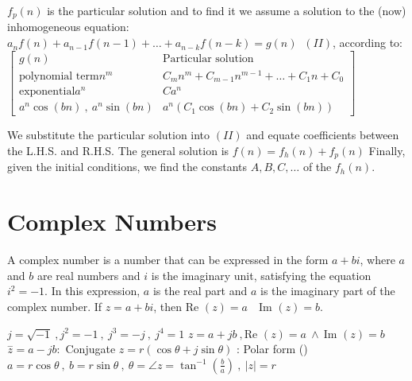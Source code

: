 \documentclass[12pt]{article}
\def\Re{\text{Re\ }} %
\def\Im{\text{Im\ }} %
\begin{document}
\begin{flushleft}
	\textbullet \quad $f_p(n)$ is the particular solution and to find it we assume a solution to the (now) inhomogeneous equation: $\displaystyle a_n f(n) + a_{n-1} f(n-1) + \ldots + a_{n-k} f(n-k) = g(n) \ $ {\tiny $(II)$}, according to: \linebreak 
	$\displaystyle \begin{bmatrix}
	g(n) & \text{Particular solution} \\ 
	\text{polynomial term} n^m & C_m n^m + C_{m-1} n^{m-1} + \ldots + C_1 n + C_0 \\ 
	\text{exponential} a^n & Ca^n \\ 
	a^n \cos (bn) \ , \ a^n \sin (bn) & a^n \left( C_1 \cos (bn) + C_2 \sin (bn) \right) 
	\end{bmatrix} $
	
	We substitute the particular solution into $(II)$ and equate coefficients between the L.H.S. and R.H.S. \linebreak 
	\textbullet \quad The general solution is $f(n) = f_h(n) + f_p(n)$ \linebreak 
	\textbullet \quad Finally, given the initial conditions, we find the constants $A, B, C, \ldots $ of the $f_h(n)$. \linebreak 
	

	\pagebreak
	
	
	\section{Complex Numbers}
	
	\textbullet \quad A complex number is a number that can be expressed in the form $a + bi$, where $a$ and $b$ are real numbers and $i$ is the imaginary unit, satisfying the equation $i^2 = -1$. In this expression, $a$ is the real part and $a$ is the imaginary part of the complex number. If $z=a+bi$, then $ \Re (z) = a \quad \Im (z) = b$. \linebreak 
	
	\textbullet \quad $\displaystyle j = \sqrt{-1}\ , j^2 = -1 \ , \ j^3 = -j \ , \ j^4 = 1$ \linebreak 
	\textbullet \quad $\displaystyle z=a+jb \ , \Re(z)=a \ \land \ \Im(z) = b$ \linebreak 
	\textbullet \quad $\displaystyle \overset{-}{z} = a -jb: $ Conjugate \linebreak 
	\textbullet \quad $\displaystyle z = r\left(\cos \theta + j \sin \theta \right) $  :  Polar form () \linebreak 
	$\displaystyle a = r \cos \theta\ , \ b = r\sin \theta \ , \ \theta = \angle z = \tan^{-1} \left(\frac{b}{a}\right) \ , \ |z| = r$ \linebreak 
	

\end{flushleft}
\end{document}
